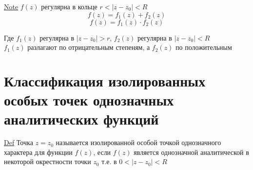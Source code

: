 \documentclass[a4paper]{article}
\begin{document}
\begin{tcolorbox}
\underline{Note} $ f(z) $ регулярна в кольце $ r < |z - z_0| < R $ 
\[
    f(z) = f_1(z) + f_2(z)
\]
\[
    f(z) = f_1(z) \cdot f_2(z)
\]

Где $ f_1(z) $ регулярна в $ |z-z_0| > r $, $ f_2(z) $ регулярна в $ |z-z_0| < R $ \\
$ f_1(z)$ разлагают по отрицательным степеням, а $ f_2(z) $ по положительным
\end{tcolorbox}

\section*{\centering Классификация изолированных особых точек однозначных аналитических
функций}

\begin{tcolorbox}
\underline{Def} Точка $ z = z_0 $ называется изолированной особой точкой
однозначного характера для функции $ f(z) $, если $ f(z) $ является однозначной
аналитической в некоторой окрестности точки $ z_0 $ т.е. в $ 0 < |z - z_0| < R $ 
\end{tcolorbox}
\end{document}
